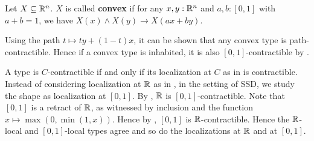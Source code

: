 \begin{definition}
  Let $X\subseteq \mathbb{R}^n$. $X$ is called \textbf{convex} if for any $x,y:\mathbb{R}^n$ and $a,b:[0,1]$ with $a+b = 1$, we have $X(x) \wedge X(y) \to X(ax+by)$. 
\end{definition}
\begin{remark}\label{ConvexInhabitedToContractible}
Using the path $t\mapsto ty + (1-t)x$, it can be shown that any convex type is path-contractible. 
Hence if a convex type is inhabited, it is also $[0,1]$-contractible by .
\end{remark}

\begin{remark}\label{localizationRImatch}
  A type is $C$-contractible if and only if its localization at $C$ as in \cite{modalities} is contractible. 
  Instead of considering localization at $\mathbb{R}$ as in \cite{shulman-Brouwer-fixed-point}, in the setting of SSD, we study the shape as localization at $[0,1]$. 
  By , $\mathbb{R}$ is $[0,1]$-contractible. Note that $[0,1]$ is a retract of $\mathbb{R}$, as witnessed by inclusion and the function $x \mapsto \max(0,\min(1,x))$. Hence by , $[0,1]$ is $\mathbb{R}$-contractible. 
  Hence the $\mathbb{R}$-local and $[0,1]$-local types agree and so do the localizations at $\mathbb{R}$ and at $[0,1]$. 
\end{remark} 


